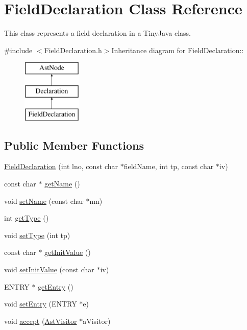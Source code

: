 \hypertarget{classFieldDeclaration}{
\section{FieldDeclaration Class Reference}
\label{classFieldDeclaration}
}


This class represents a field declaration in a TinyJava class.  


{\ttfamily \#include $<$FieldDeclaration.h$>$}Inheritance diagram for FieldDeclaration::\begin{figure}[H]
\begin{center}
\leavevmode
\includegraphics[height=3cm]{classFieldDeclaration}
\end{center}
\end{figure}
\subsection*{Public Member Functions}
\begin{DoxyCompactItemize}
\item 
\hyperlink{classFieldDeclaration_ae9f21a335682f2c26688c8edaf9881e6}{FieldDeclaration} (int lno, const char $\ast$fieldName, int tp, const char $\ast$iv)
\item 
const char $\ast$ \hyperlink{classFieldDeclaration_a132a85e17482895ac3af743eca97b2c4}{getName} ()
\item 
void \hyperlink{classFieldDeclaration_a960feae9f9db3bda2fb1ff5d410c3613}{setName} (const char $\ast$nm)
\item 
int \hyperlink{classFieldDeclaration_af7bf6c60c56fbe7e8e27e470fb6ff870}{getType} ()
\item 
void \hyperlink{classFieldDeclaration_a0dd7650a679bfa235441789848a54740}{setType} (int tp)
\item 
const char $\ast$ \hyperlink{classFieldDeclaration_afaef5c16cd739826c2e1463666690e95}{getInitValue} ()
\item 
void \hyperlink{classFieldDeclaration_a7b9500c22fec4f983f696751a2581fa7}{setInitValue} (const char $\ast$iv)
\item 
ENTRY $\ast$ \hyperlink{classFieldDeclaration_a133d01ba5677049a2fb8eeebc91229c0}{getEntry} ()
\item 
void \hyperlink{classFieldDeclaration_a0220f27540af855ca7c7803728926fb5}{setEntry} (ENTRY $\ast$e)
\item 
void \hyperlink{classFieldDeclaration_a60ce09d75a5864803ca3b24530267af1}{accept} (\hyperlink{classAstVisitor}{AstVisitor} $\ast$aVisitor)
\end{DoxyCompactItemize}


